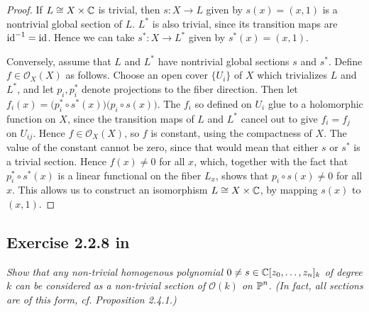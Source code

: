 \documentclass{article}
\begin{document}
\begin{proof}
If $L \cong X \times \mathbb{C}$ is trivial, then $s : X \to L$ given by $s(x) = (x,1)$ is a nontrivial global section
of $L$. $L^*$ is also trivial, since its transition maps are $\operatorname{id} ^{-1} = \operatorname{id}$. Hence we can take $s^* : X \to L^*$
given by $s^*(x) = (x,1)$.

Conversely, assume that $L$ and $L^*$ have nontrivial global sections $s$ and $s^*$. Define $f \in \mathcal{O}_X(X)$
as follows. Choose an open cover $\{U_i\}$ of $X$ which trivializes $L$ and $L^*$, and let $p_i, p_i^*$ denote
projections to the fiber direction. Then let $f_i(x) = \big(p_i^* \circ s^*(x)\big) \big(p_i \circ s(x)\big)$.
The $f_i$ so defined on $U_i$ glue to a holomorphic function on $X$, since the transition maps of $L$ and $L^*$
cancel out to give $f_i = f_j$ on $U_{ij}$. Hence $f \in \mathcal{O}_X(X)$, so $f$ is constant, using the compactness
of $X$. The value of
the constant cannot be zero, since that would mean that either $s$ or $s^*$ is a trivial section. Hence
$f(x) \neq 0$ for all $x$, which, together with the fact that $p_i^* \circ s^*(x)$ is a linear functional on
the fiber $L_x$, shows that $p_i \circ s(x) \neq 0$ for all $x$. This allows us to construct an isomorphism 
$L \cong X \times \mathbb{C}$, by mapping $s(x)$ to $(x,1)$.
\end{proof}


\subsection*{Exercise 2.2.8 in \cite{Huy}}
\emph{Show that any non-trivial homogenous polynomial $0\neq s \in \mathbb{C}[z_0, \dots, z_n]_k$ of degree $k$ can be
considered as a non-trivial section of $\mathcal{O}(k)$ on $\operatorname{\mathbb{P}}^n$. (In fact, all sections are of this form, cf.
Proposition 2.4.1.)}
\end{document}

